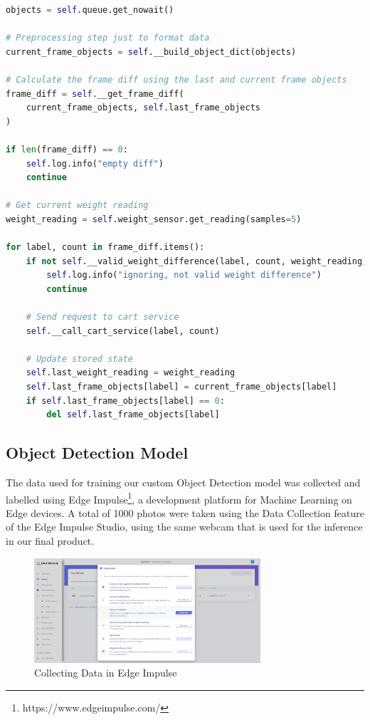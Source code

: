 \documentclass[openright]{normas-utf-tex} %
\begin{document}
\begin{lstlisting}[language=Python,caption={Product Recognizer thread logic}]
objects = self.queue.get_nowait()

# Preprocessing step just to format data
current_frame_objects = self.__build_object_dict(objects)

# Calculate the frame diff using the last and current frame objects
frame_diff = self.__get_frame_diff(
    current_frame_objects, self.last_frame_objects
)

if len(frame_diff) == 0:
    self.log.info("empty diff")
    continue

# Get current weight reading
weight_reading = self.weight_sensor.get_reading(samples=5)

for label, count in frame_diff.items():
    if not self.__valid_weight_difference(label, count, weight_reading):
        self.log.info("ignoring, not valid weight difference")
        continue

    # Send request to cart service
    self.__call_cart_service(label, count)

    # Update stored state
    self.last_weight_reading = weight_reading
    self.last_frame_objects[label] = current_frame_objects[label]
    if self.last_frame_objects[label] == 0:
        del self.last_frame_objects[label]
\end{lstlisting}

\subsection{Object Detection Model}

The data used for training our custom Object Detection model was collected and labelled
using Edge Impulse\footnote{https://www.edgeimpulse.com/}, a development platform for Machine 
Learning on Edge devices.
A total of 1000 photos were taken using the Data Collection feature of the Edge Impulse Studio,
using the same webcam that is used for the inference in our final product.

\begin{figure}[H]
	\centering
	\includegraphics[width=0.75\textwidth]{./images/edge-impulse-collect-data.png}
	\caption[Collecting Data in Edge Impulse]{Collecting Data in Edge Impulse}
    \label{fig:diff}
\end{figure}
\end{document}
